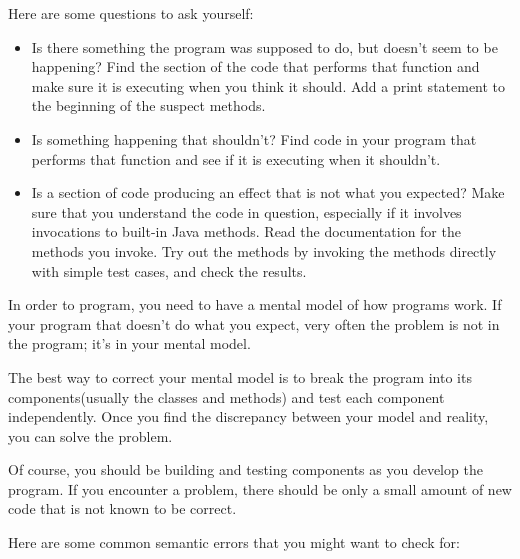 \documentclass{book}
\begin{document}
Here are some questions to ask yourself:

\begin{itemize}

\item Is there something the program was supposed to do, but
doesn't seem to be happening?  Find the section of the code
that performs that function and make sure it is executing when
you think it should.  Add a print statement to the beginning
of the suspect methods.

\item Is something happening that shouldn't?  Find code in
your program that performs that function and see if it is
executing when it shouldn't.

\item Is a section of code producing an effect that is not
what you expected?  Make sure that you understand the code in
question, especially if it involves invocations to built-in
Java methods.  Read the documentation for the methods you invoke.
Try out the methods by invoking the methods directly with
simple test cases, and check the results.

\end{itemize}

In order to program, you need to have a mental model of how
programs work.  If your program that doesn't do what you expect,
very often the problem is not in the program; it's in your mental
model.


The best way to correct your mental model is to break the program
into its components(usually the classes and methods) and test
each component independently.  Once you find the discrepancy
between your model and reality, you can solve the problem.

Of course, you should be building and testing components as you
develop the program.  If you encounter a problem, there should be only
a small amount of new code that is not known to be correct.

Here are some common semantic errors that you might want to check for:
\end{document}
